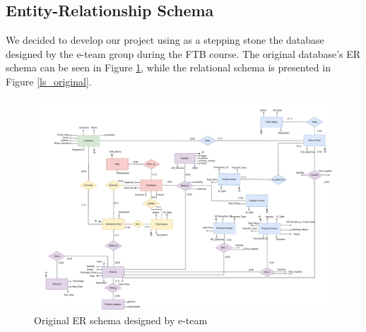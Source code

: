\subsection{Entity-Relationship Schema}

We decided to develop our project using as a stepping stone the database designed by the e-team group during the FTB course. The original database's ER schema can be seen in Figure \ref{er_original}, while the relational schema is presented in Figure \ref{ls_original}.
\\
\begin{figure}[H]
\centering
\includegraphics[width=\textwidth]{Schemas/ER_original.drawio.pdf}
\caption{Original ER schema designed by e-team}
\label{er_original}
\end{figure}

